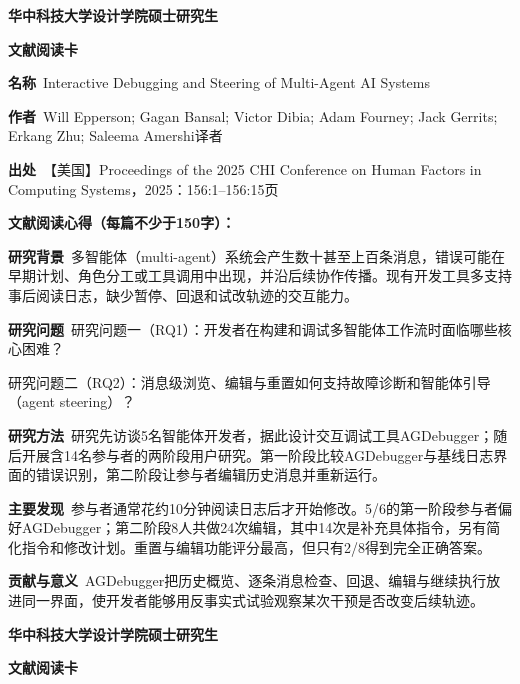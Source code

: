 \clearpage
\begin{center}
{\songti\bfseries\fontsize{18.5pt}{27.75pt}\selectfont 华中科技大学设计学院硕士研究生\par}
{\songti\bfseries\fontsize{18.5pt}{27.75pt}\selectfont 文献阅读卡\par}
\end{center}
\vspace{0.25em}
\noindent\underline{}\par
\vspace{0.35em}
\noindent\textbf{名称}\ Interactive Debugging and Steering of Multi-Agent AI Systems\par
\noindent\textbf{作者}\ Will Epperson; Gagan Bansal; Victor Dibia; Adam Fourney; Jack Gerrits; Erkang Zhu; Saleema Amershi\quad 译者\par
\noindent\textbf{出处}\ 【美国】Proceedings of the 2025 CHI Conference on Human Factors in Computing Systems，2025：156:1–156:15\quad 页\par
\vspace{0.35em}
\noindent\textbf{文献阅读心得（每篇不少于150字）：}\par
\noindent\textbf{研究背景}\ 多智能体（multi-agent）系统会产生数十甚至上百条消息，错误可能在早期计划、角色分工或工具调用中出现，并沿后续协作传播。现有开发工具多支持事后阅读日志，缺少暂停、回退和试改轨迹的交互能力。\par
\noindent\textbf{研究问题}\ 研究问题一（RQ1）：开发者在构建和调试多智能体工作流时面临哪些核心困难？\par
研究问题二（RQ2）：消息级浏览、编辑与重置如何支持故障诊断和智能体引导（agent steering）？\par
\noindent\textbf{研究方法}\ 研究先访谈5名智能体开发者，据此设计交互调试工具AGDebugger；随后开展含14名参与者的两阶段用户研究。第一阶段比较AGDebugger与基线日志界面的错误识别，第二阶段让参与者编辑历史消息并重新运行。\par
\noindent\textbf{主要发现}\ 参与者通常花约10分钟阅读日志后才开始修改。5/6的第一阶段参与者偏好AGDebugger；第二阶段8人共做24次编辑，其中14次是补充具体指令，另有简化指令和修改计划。重置与编辑功能评分最高，但只有2/8得到完全正确答案。\par
\noindent\textbf{贡献与意义}\ AGDebugger把历史概览、逐条消息检查、回退、编辑与继续执行放进同一界面，使开发者能够用反事实式试验观察某次干预是否改变后续轨迹。\par
\clearpage
\begin{center}
{\songti\bfseries\fontsize{18.5pt}{27.75pt}\selectfont 华中科技大学设计学院硕士研究生\par}
{\songti\bfseries\fontsize{18.5pt}{27.75pt}\selectfont 文献阅读卡\par}
\end{center}
